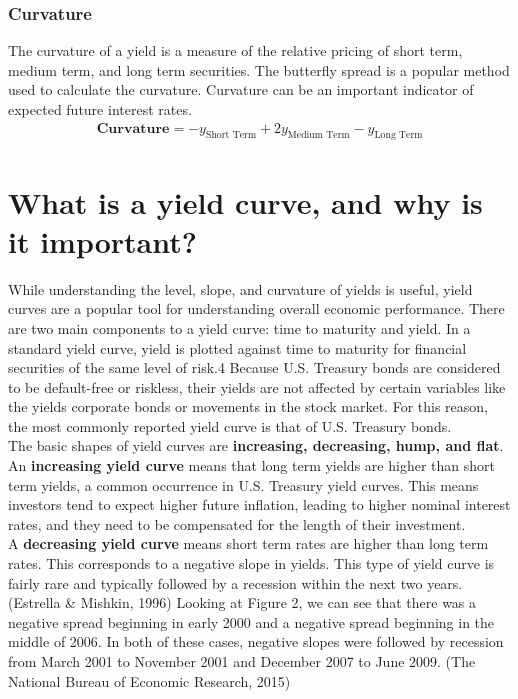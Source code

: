 \documentclass[11pt]{report}
\begin{document}
\subsubsection{Curvature}

The curvature of a yield is a measure of the relative pricing of short term, medium term, and long term securities. The butterfly spread is a popular method used to calculate the curvature. Curvature can be an important indicator of expected future interest rates.
\begin{align}
	\textbf{Curvature}=-y_{\text{Short Term}} + 2y_{\text{Medium Term}} - y_{\text{Long Term}} \label{yield_curvature}
\end{align}



\section{What is a yield curve, and why is it important?}

While understanding the level, slope, and curvature of yields is useful, yield curves are a popular tool for understanding overall economic performance. There are two main components to a yield curve: time to maturity and yield. In a standard yield curve, yield is plotted against time to maturity for financial securities of the same level of risk.4 Because U.S. Treasury bonds are considered to be default-free or riskless, their yields are not affected by certain variables like the yields corporate bonds or movements in the stock market. For this reason, the most commonly reported yield curve is that of U.S. Treasury bonds.\\

The basic shapes of yield curves are \textbf{increasing, decreasing, hump, and flat}. An \textbf{increasing yield curve} means that long term yields are higher than short term yields, a common occurrence in U.S. Treasury yield curves. This means investors tend to expect higher future inflation, leading to higher nominal interest rates, and they need to be compensated for the length of their investment.\\

A \textbf{decreasing yield curve} means short term rates are higher than long term rates. This corresponds to a negative slope in yields. This type of yield curve is fairly rare and typically followed by a recession within the next two years. (Estrella \& Mishkin, 1996) Looking at Figure 2, we can see that there was a negative spread beginning in early 2000 and a negative spread beginning in the middle of 2006. In both of these cases, negative slopes were followed by recession from March 2001 to November 2001 and December 2007 to June 2009. (The National Bureau of Economic Research, 2015)\\
\end{document}
